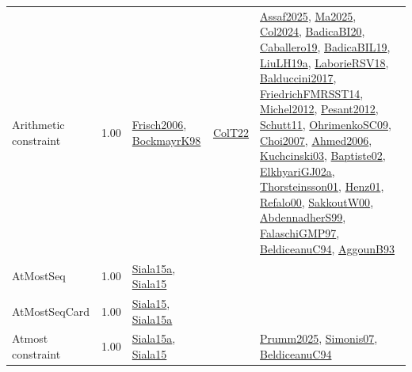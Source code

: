 {\begin{longtable}{p{3cm}r>{\raggedright\arraybackslash}p{6cm}>{\raggedright\arraybackslash}p{6cm}>{\raggedright\arraybackslash}p{8cm}}
\index{Arithmetic constraint}\index{Constraints!Arithmetic constraint}Arithmetic constraint &  1.00 & \hyperref[detail:Frisch2006]{Frisch2006}, \hyperref[detail:BockmayrK98]{BockmayrK98} & \hyperref[detail:ColT22]{ColT22} & \hyperref[detail:Assaf2025]{Assaf2025}, \hyperref[detail:Ma2025]{Ma2025}, \hyperref[detail:Col2024]{Col2024}, \hyperref[detail:BadicaBI20]{BadicaBI20}, \hyperref[detail:Caballero19]{Caballero19}, \hyperref[detail:BadicaBIL19]{BadicaBIL19}, \hyperref[detail:LiuLH19a]{LiuLH19a}, \hyperref[detail:LaborieRSV18]{LaborieRSV18}, \hyperref[detail:Balduccini2017]{Balduccini2017}, \hyperref[detail:FriedrichFMRSST14]{FriedrichFMRSST14}, \hyperref[detail:Michel2012]{Michel2012}, \hyperref[detail:Pesant2012]{Pesant2012}, \hyperref[detail:Schutt11]{Schutt11}, \hyperref[detail:OhrimenkoSC09]{OhrimenkoSC09}, \hyperref[detail:Choi2007]{Choi2007}, \hyperref[detail:Ahmed2006]{Ahmed2006}, \hyperref[detail:Kuchcinski03]{Kuchcinski03}, \hyperref[detail:Baptiste02]{Baptiste02}, \hyperref[detail:ElkhyariGJ02a]{ElkhyariGJ02a}, \hyperref[detail:Thorsteinsson01]{Thorsteinsson01}, \hyperref[detail:Henz01]{Henz01}, \hyperref[detail:Refalo00]{Refalo00}, \hyperref[detail:SakkoutW00]{SakkoutW00}, \hyperref[detail:AbdennadherS99]{AbdennadherS99}, \hyperref[detail:FalaschiGMP97]{FalaschiGMP97}, \hyperref[detail:BeldiceanuC94]{BeldiceanuC94}, \hyperref[detail:AggounB93]{AggounB93}\\
\index{AtMostSeq}\index{Constraints!AtMostSeq}AtMostSeq &  1.00 & \hyperref[detail:Siala15a]{Siala15a}, \hyperref[detail:Siala15]{Siala15} &  & \\
\index{AtMostSeqCard}\index{Constraints!AtMostSeqCard}AtMostSeqCard &  1.00 & \hyperref[detail:Siala15]{Siala15}, \hyperref[detail:Siala15a]{Siala15a} &  & \\
\index{Atmost constraint}\index{Constraints!Atmost constraint}Atmost constraint &  1.00 & \hyperref[detail:Siala15a]{Siala15a}, \hyperref[detail:Siala15]{Siala15} &  & \hyperref[detail:Prumm2025]{Prumm2025}, \hyperref[detail:Simonis07]{Simonis07}, \hyperref[detail:BeldiceanuC94]{BeldiceanuC94}\\

\end{longtable}}
